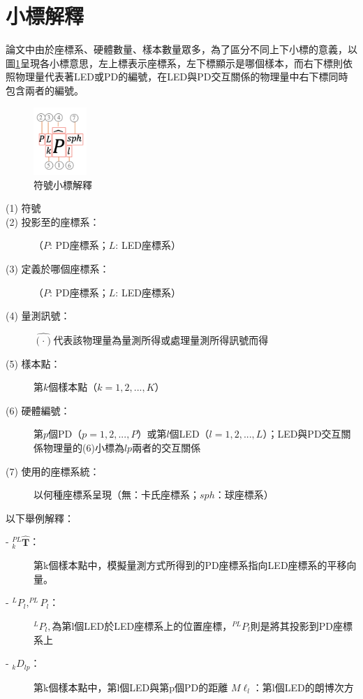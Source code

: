 \onehalfspacing

\section*{小標解釋}

論文中由於座標系、硬體數量、樣本數量眾多，為了區分不同上下小標的意義，以圖\ref{pic:symbol}呈現各小標意思，左上標表示座標系，左下標顯示是哪個樣本，而右下標則依照物理量代表著LED或PD的編號，在LED與PD交互關係的物理量中右下標同時包含兩者的編號。

\begin{figure}[ht]
	\centering
	\includegraphics[width=2cm]{ch1pic/not_whole.png}
    \caption{符號小標解釋}
    \label{pic:symbol}
\end{figure}



\begin{description}
    \item[(1) 符號] 
    \item[(2) 投影至的座標系：] （$P$: PD座標系；$L$: LED座標系）
    \item[(3) 定義於哪個座標系：] （$P$: PD座標系；$L$: LED座標系）
    \item[(4) 量測訊號：] $\hat{(\cdot)}$代表該物理量為量測所得或處理量測所得訊號而得
    \item[(5) 樣本點：] 第$k$個樣本點（$k=1,2,...,K$）
    \item[(6) 硬體編號：] 第$p$個PD（$p=1,2,...,P$）或第$l$個LED（$l=1,2,...,L$）；LED與PD交互關係物理量的(6)小標為$lp$兩者的交互關係
    \item[(7) 使用的座標系統：]  以何種座標系呈現（無：卡氏座標系；$sph$：球座標系）
\end{description}


\onehalfspacing

以下舉例解釋：
\begin{description}
\item[- $^{PL}_{k}\hat{\boldsymbol{T}}$：]第k個樣本點中，模擬量測方式所得到的PD座標系指向LED座標系的平移向量。

\item[- $^{L}P_l,^{PL}P_l$：]$^{L}P_l,$為第l個LED於LED座標系上的位置座標，$^{PL}P_l$則是將其投影到PD座標系上

\item[- $_{k}D_{l p}$：]第k個樣本點中，第l個LED與第p個PD的距離
$M\ell_l$：第l個LED的朗博次方
\end{description}